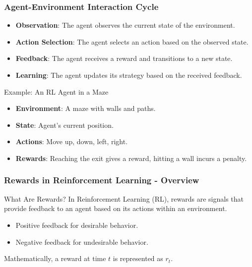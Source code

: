 \documentclass{beamer}
\begin{document}
\begin{frame}[fragile]
    \frametitle{Agent-Environment Interaction Cycle}
    \begin{itemize}
        \item \textbf{Observation}: The agent observes the current state of the environment.
        \item \textbf{Action Selection}: The agent selects an action based on the observed state.
        \item \textbf{Feedback}: The agent receives a reward and transitions to a new state.
        \item \textbf{Learning}: The agent updates its strategy based on the received feedback.
    \end{itemize}
    \begin{block}{Example: An RL Agent in a Maze}
        \begin{itemize}
            \item \textbf{Environment}: A maze with walls and paths.
            \item \textbf{State}: Agent's current position.
            \item \textbf{Actions}: Move up, down, left, right.
            \item \textbf{Rewards}: Reaching the exit gives a reward, hitting a wall incurs a penalty.
        \end{itemize}
    \end{block}
\end{frame}

\begin{frame}[fragile]
    \frametitle{Rewards in Reinforcement Learning - Overview}
    \begin{block}{What Are Rewards?}
        In Reinforcement Learning (RL), rewards are signals that provide feedback to an agent based on its actions within an environment.
        \begin{itemize}
            \item Positive feedback for desirable behavior.
            \item Negative feedback for undesirable behavior.
        \end{itemize}
        Mathematically, a reward at time \( t \) is represented as \( r_t \).
    \end{block}
\end{frame}
\end{document}
